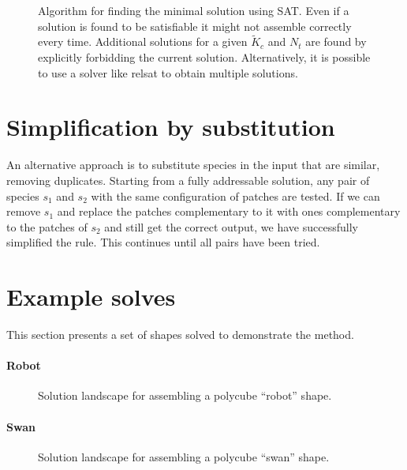 \begin{figure}
    \centering
    \resizebox{\textwidth}{!}{}
    \caption{Algorithm for finding the minimal solution using SAT. Even if a solution is found to be satisfiable it might not assemble correctly every time. Additional solutions for a given \(\widetilde{K}_c\) and \(N_t\) are found by explicitly forbidding the current solution. Alternatively, it is possible to use a solver like relsat to obtain multiple solutions. }
    \label{fig:sat_alg}
\end{figure}

\section{Simplification by substitution}
An alternative approach is to substitute species in the input that are similar, removing duplicates. Starting from a fully addressable solution, any pair of species \(s_1\) and \(s_2\) with the same configuration of patches are tested. If we can remove \(s_1\) and replace the patches complementary to it with ones complementary to the patches of \(s_2\) and still get the correct output, we have successfully simplified the rule. This continues until all pairs have been tried.

\section{Example solves}
This section presents a set of shapes solved to demonstrate the method.

\paragraph{Robot}

\begin{figure}[h]
    \caption{Solution landscape for assembling a polycube ``robot'' shape.}
    \label{fig:robot}
\end{figure}

\paragraph{Swan}

\begin{figure}[h]
    \caption{Solution landscape for assembling a polycube ``swan'' shape.}
    \label{fig:swan}
\end{figure}

